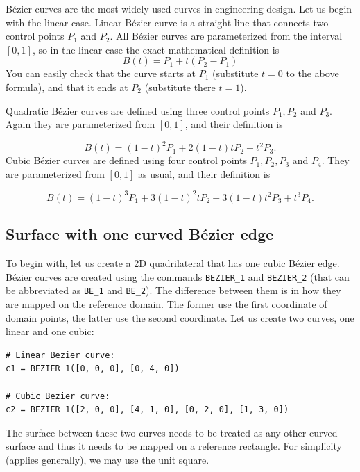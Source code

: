 B\'ezier curves are the most widely used curves in engineering design. 
Let us begin with the linear case. Linear B\'ezier curve is a straight line that
connects two control points $P_1$ and $P_2$. All B\'ezier curves are parameterized
from the interval $[0, 1]$, so in the linear case the exact mathematical definition is
$$
  B(t) = P_1 + t(P_2 - P_1)
$$ 
You can easily check that the curve starts at $P_1$ (substitute $t = 0$ to the above formula),
and that it ends at $P_2$ (substitute there $t = 1$).

Quadratic B\'ezier curves are defined using three control points $P_1, P_2$ and $P_3$. Again they are
parameterized from $[0, 1]$, and their definition is

$$
  B(t) = (1 - t)^2 P_1 + 2(1 - t)t P_2 + t^2 P_3.
$$ 
Cubic B\'ezier curves are defined using four control points $P_1, P_2, P_3$ and $P_4$. They are
parameterized from $[0, 1]$ as usual, and their definition is

$$
  B(t) = (1 - t)^3 P_1 + 3(1 - t)^2t P_2 + 3(1-t)t^2 P_3 + t^3 P_4.
$$ 

\subsection{Surface with one curved B\'ezier edge}

To begin with, let us create a 2D quadrilateral that has one cubic B\'ezier edge. 
B\'ezier curves are created using the commands {\tt BEZIER\_1} and {\tt BEZIER\_2} 
(that can be abbreviated as {\tt BE\_1} and {\tt BE\_2}). The difference between
them is in how they are mapped on the reference domain. The former use the 
first coordinate of domain points, the latter use the second coordinate. Let
us create two curves, one linear and one cubic:\\

\begin{bbox}
\begin{verbatim}
# Linear Bezier curve:
c1 = BEZIER_1([0, 0, 0], [0, 4, 0])

# Cubic Bezier curve:
c2 = BEZIER_1([2, 0, 0], [4, 1, 0], [0, 2, 0], [1, 3, 0])
\end{verbatim}
\end{bbox}
\vspace{6mm}

\noindent
The surface between these two curves needs to be treated as any other curved 
surface and thus it needs to be mapped on a reference rectangle. For simplicity 
(applies generally), we may use the unit square. \\

